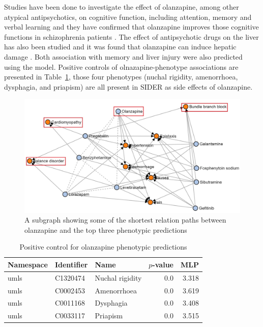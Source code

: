 Studies have been done to investigate the effect of olanzapine, among other atypical antipsychotics, on cognitive function, including attention, memory and verbal learning and they have confirmed that olanzapine improves those cognitive functions in schizophrenia patients \cite{mcgurk_cognitive_2004, smith_effects_2001, cuesta_effects_2001, purdon_neuropsychological_2000, bilder_neurocognitive_2002}.
The effect of antipsychotic drugs on the liver has also been studied and it was found that olanzapine can induce hepatic damage \cite{lv_antipsychotic_2018}.
Both association with memory and liver injury were also predicted using the model.
Positive controls of olnazapine-phenotype associations are presented in Table~\ref{tab:ps_olanzapine}, those four phenotypes (nuchal rigidity, amenorrhoea, dysphagia, and priapism) are all present in \ac{SIDER} as side effects of olanzapine.

\begin{figure}[h!]
    \centering
    \includegraphics[scale=0.6]
    {figures/olanzapine_phenotypes.jpg}
    \caption[Olanzapine-phentypes path subgraph]{\label{fig:olanzapine_phenotypes} A subgraph showing some of the shortest relation paths between olanzapine and the top three phenotypic predictions}
\end{figure}

\begin{table}
    \centering
    \begin{tabular}{|l|l|l|r|r|}
        \hline
        \textbf{Namespace} & \textbf{Identifier} & \textbf{Name} & \textbf{$p$-value} & \textbf{MLP} \\
        \hline
        umls & C1320474 & Nuchal rigidity &  0.0 & 3.318 \\
        \hline
        umls & C0002453 &  Amenorrhoea &  0.0 & 3.619 \\
        \hline
        umls & C0011168 &  Dysphagia &  0.0 & 3.408 \\
        \hline
        umls &  C0033117 & Priapism &  0.0 &  3.515 \\
        \hline
    \end{tabular}
    \caption{Positive control for olanzapine phenotypic predictions}
    \label{tab:ps_olanzapine}
\end{table}


